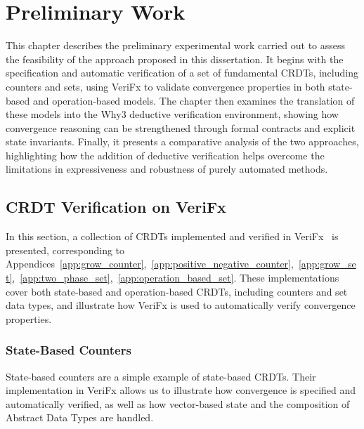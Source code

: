 
%

\chapter{Preliminary Work}
\label{cha:preliminary}

This chapter describes the preliminary experimental work carried out to assess the feasibility of the approach proposed in this dissertation. It begins with the specification and automatic verification of a set of fundamental CRDTs, including counters and sets, using VeriFx to validate convergence properties in both state-based and operation-based models. The chapter then examines the translation of these models into the Why3 deductive verification environment, showing how convergence reasoning can be strengthened through formal contracts and explicit state invariants. Finally, it presents a comparative analysis of the two approaches, highlighting how the addition of deductive verification helps overcome the limitations in expressiveness and robustness of purely automated methods.

\section{CRDT Verification on VeriFx}
\label{sec:crdt_verification_verifx}

In this section, a collection of CRDTs implemented and verified in VeriFx~\cite{porre2023masses} is presented, corresponding to Appendices~\ref{app:grow_counter},~\ref{app:positive_negative_counter},~\ref{app:grow_set},~\ref{app:two_phase_set},~\ref{app:operation_based_set}. These implementations cover both state-based and operation-based CRDTs, including counters and set data types, and illustrate how VeriFx is used to automatically verify convergence properties.

\subsection{State-Based Counters}
\label{sub:state_counters}

State-based counters are a simple example of state-based CRDTs. Their implementation in VeriFx allows us to illustrate how convergence is specified and automatically verified, as well as how vector-based state and the composition of Abstract Data Types are handled.

